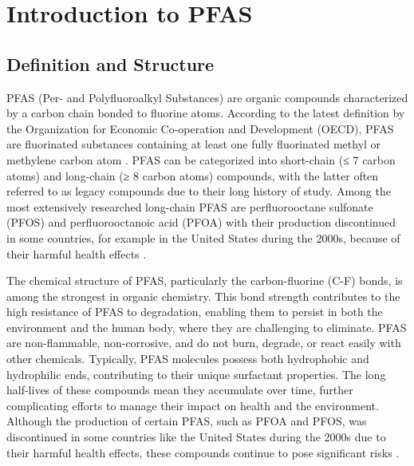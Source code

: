 
\chapter{Introduction to PFAS}

\label{Chapter2}

\newcommand{\keyword}[1]{\textbf{#1}}
\newcommand{\tabhead}[1]{\textbf{#1}}
\newcommand{\code}[1]{\texttt{#1}}
\newcommand{\file}[1]{\texttt{\bfseries#1}}
\newcommand{\option}[1]{\texttt{\itshape#1}}


\section{Definition and Structure}

PFAS (Per- and Polyfluoroalkyl Substances) are organic compounds characterized by a carbon chain bonded to fluorine atoms. According to the latest definition by the Organization for Economic Co-operation and Development (OECD), PFAS are fluorinated substances containing at least one fully fluorinated methyl or methylene carbon atom \cite{2}. PFAS can be categorized into short-chain (≤ 7 carbon atoms) and long-chain (≥ 8 carbon atoms) compounds, with the latter often referred to as legacy compounds due to their long history of study. Among the most extensively researched long-chain PFAS are perfluorooctane sulfonate (PFOS) and perfluorooctanoic acid (PFOA) with their production discontinued in some countries, for example in the United States during the 2000s, because of their harmful health effects\cite{2} \cite{3}.

The chemical structure of PFAS, particularly the carbon-fluorine (C-F) bonds, is among the strongest in organic chemistry. This bond strength contributes to the high resistance of PFAS to degradation, enabling them to persist in both the environment and the human body, where they are challenging to eliminate. PFAS are non-flammable, non-corrosive, and do not burn, degrade, or react easily with other chemicals. Typically, PFAS molecules possess both hydrophobic and hydrophilic ends, contributing to their unique surfactant properties. The long half-lives of these compounds mean they accumulate over time, further complicating efforts to manage their impact on health and the environment. Although the production of certain PFAS, such as PFOA and PFOS, was discontinued in some countries like the United States during the 2000s due to their harmful health effects, these compounds continue to pose significant risks \cite{PFOA_PFOS_risk}.


